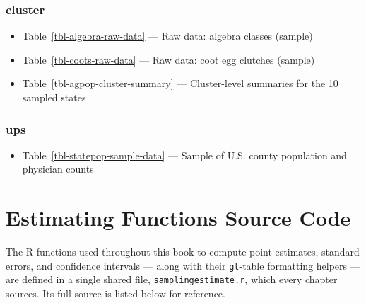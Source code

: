 \documentclass[
  letterpaper,
  DIV=11,
  numbers=noendperiod]{scrreprt}
\providecommand{\tightlist}{%
  \setlength{\itemsep}{0pt}\setlength{\parskip}{0pt}}
\renewcommand{\[}{\begin{equation}}
\renewcommand{\]}{\end{equation}}
\begin{document}
\subsection{cluster}\label{cluster-1}

\begin{itemize}
\tightlist
\item
  Table~\ref{tbl-algebra-raw-data} --- Raw data: algebra classes
  (sample)
\item
  Table~\ref{tbl-coots-raw-data} --- Raw data: coot egg clutches
  (sample)
\item
  Table~\ref{tbl-agpop-cluster-summary} --- Cluster-level summaries for
  the 10 sampled states
\end{itemize}

\subsection{ups}\label{ups-1}

\begin{itemize}
\tightlist
\item
  Table~\ref{tbl-statepop-sample-data} --- Sample of U.S. county
  population and physician counts
\end{itemize}

\chapter{Estimating Functions Source
Code}\label{sec-estimating-functions}

The R functions used throughout this book to compute point estimates,
standard errors, and confidence intervals --- along with their
\texttt{gt}-table formatting helpers --- are defined in a single shared
file, \texttt{samplingestimate.r}, which every chapter sources. Its full
source is listed below for reference.
\end{document}
